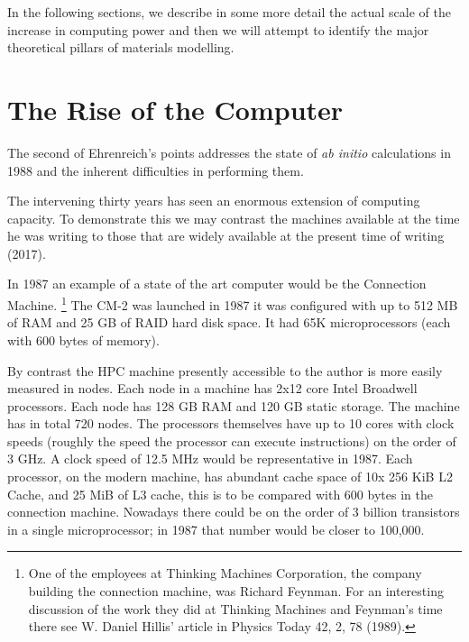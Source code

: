In the following sections, we describe in some more detail the 
actual scale of the increase in computing power and then we will
attempt to identify the major theoretical pillars of 
materials modelling.

\section{The Rise of the Computer}
\label{sec:riseofcomp}
The second of Ehrenreich's points addresses the state of
{\it ab initio} calculations in 1988 and
the inherent difficulties in performing them.

The intervening thirty years has seen an enormous extension of computing capacity. 
To demonstrate this we may contrast the machines available at the time
he was writing to those that are widely available at the present time of writing (2017). 

In 1987 an example of a state of the art computer would be the Connection Machine.
\footnote{One of the employees at Thinking Machines Corporation,
the company building the connection machine, was Richard Feynman.
For an interesting discussion of the work they
did at Thinking Machines and Feynman's time there see W. Daniel
Hillis' article in Physics Today 42, 2, 78 (1989).}
The CM-2 was launched in 1987 it was configured with up to 512 MB of RAM and 25 GB of RAID
hard disk space. It had 65K microprocessors (each with 600 bytes of memory). 

By contrast the HPC machine presently accessible to the author 
is more easily measured in nodes. Each node in a machine has 2x12 core 
Intel Broadwell processors.
Each node has 128 GB RAM and 120 GB static storage. The machine has in total 720 nodes. 
The processors themselves have up to 10 cores with clock speeds (roughly the speed the
processor can execute instructions) on the order of 3 GHz. A clock speed of 12.5 MHz 
would be representative in 1987. 
Each processor, on the modern machine, has abundant cache 
space of 10x 256 KiB L2 Cache, and 25 MiB of L3 cache,
this is to be compared with 600 bytes in the connection machine. 
Nowadays there could be on the order of 3 billion 
transistors in a single microprocessor;
in 1987 that number would be closer to 100,000. 

